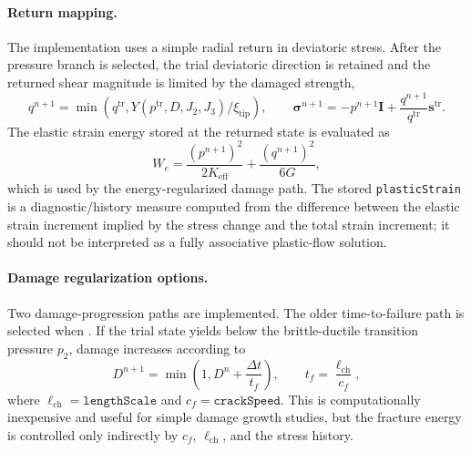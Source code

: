 \paragraph{Return mapping.}
The implementation uses a simple radial return in deviatoric stress.  After the pressure branch is selected, the trial deviatoric direction is retained and the returned shear magnitude is limited by the damaged strength,
\begin{equation}
  q^{n+1}=\min\left(q^{\mathrm{tr}},Y(p^{\mathrm{tr}},D,J_2,J_3)/\xi_{\mathrm{tip}}\right),
  \qquad
  \boldsymbol{\sigma}^{n+1}=-p^{n+1}\mathbf{I}+\frac{q^{n+1}}{q^{\mathrm{tr}}}\mathbf{s}^{\mathrm{tr}}.
  \label{eq:ceramic-radial-return}
\end{equation}
The elastic strain energy stored at the returned state is evaluated as
\begin{equation}
  W_e = \frac{(p^{n+1})^2}{2K_{\mathrm{eff}}}+\frac{(q^{n+1})^2}{6G},
  \label{eq:ceramic-elastic-energy}
\end{equation}
which is used by the energy-regularized damage path.  The stored \texttt{plasticStrain} is a diagnostic/history measure computed from the difference between the elastic strain increment implied by the stress change and the total strain increment; it should not be interpreted as a fully associative plastic-flow solution.

\paragraph{Damage regularization options.}
Two damage-progression paths are implemented.  The older time-to-failure path is selected when .  If the trial state yields below the brittle-ductile transition pressure \(p_2\), damage increases according to
\begin{equation}
  D^{n+1}=\min\left(1,D^n+\frac{\Delta t}{t_f}\right),
  \qquad
  t_f=\frac{\ell_{\mathrm{ch}}}{c_f},
  \label{eq:ceramic-time-to-failure}
\end{equation}
where \(\ell_{\mathrm{ch}}=\texttt{lengthScale}\) and \(c_f=\texttt{crackSpeed}\).  This is computationally inexpensive and useful for simple damage growth studies, but the fracture energy is controlled only indirectly by \(c_f\), \(\ell_{\mathrm{ch}}\), and the stress history.

